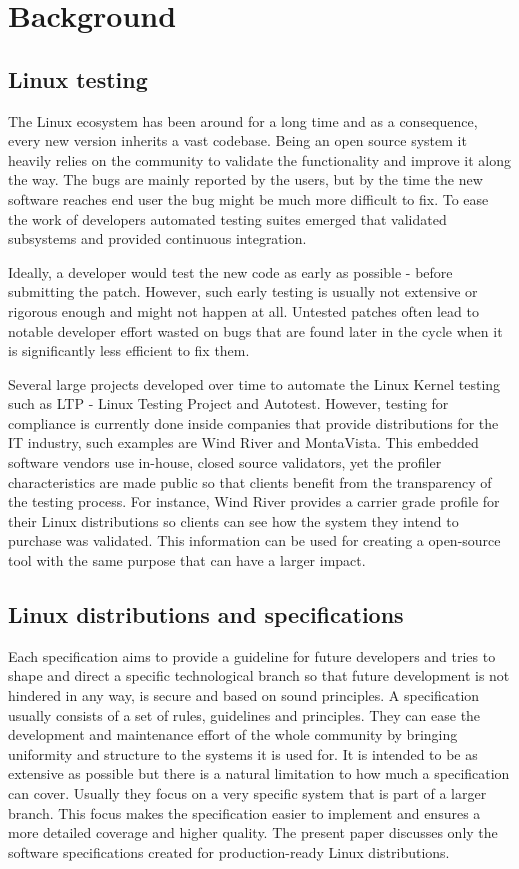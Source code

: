 \chapter{Background}

\section{Linux testing}

The Linux ecosystem has been around for a long time and as a consequence, every new version inherits a vast codebase. Being an open source system it heavily relies on the community to validate the functionality and improve it along the way. The bugs are mainly reported by the users, but by the time the new software reaches end user the bug might be much more difficult to fix. To ease the work of developers automated testing suites emerged that validated subsystems and provided continuous integration.

Ideally, a developer would test the new code as early as possible - before submitting the patch. However, such early testing is usually not extensive or rigorous enough and might not happen at all. Untested patches often lead to notable developer effort wasted on bugs that are found later in the cycle when it is significantly less efficient to fix them.

Several large projects developed over time to automate the Linux Kernel testing such as LTP - Linux Testing Project and Autotest. However, testing for compliance is currently done inside companies that provide distributions for the IT industry, such examples are Wind River and MontaVista. This embedded software vendors use in-house, closed source validators, yet the profiler characteristics are made public so that clients benefit from the transparency of the testing process. For instance, Wind River provides a carrier grade profile for their Linux distributions so clients can see how the system they intend to purchase was validated. This information can be used for creating a open-source tool with the same purpose that can have a larger impact.

\section{Linux distributions and specifications}

Each specification aims to provide a guideline for future developers and tries to shape and direct a specific technological branch so that future development is not hindered in any way, is secure and based on sound principles. A specification usually consists of a set of rules, guidelines and principles. They can ease the development and maintenance effort of the whole community by bringing uniformity and structure to the systems it is used for. It is intended to be as extensive as possible but there is a natural limitation to how much a specification can cover. Usually they focus on a very specific system that is part of a larger branch. This focus makes the specification easier to implement and ensures a more detailed coverage and higher quality. The present paper discusses only the software specifications created for production-ready Linux distributions.

